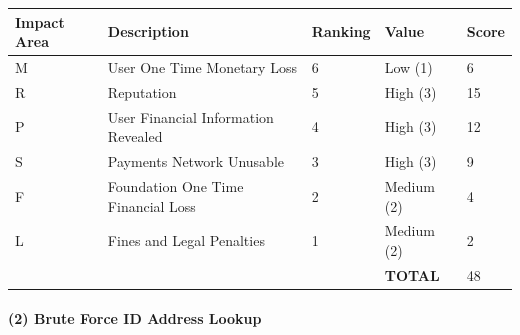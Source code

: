 \documentclass[a4paper,12pt]{article} %
\begin{document}
{\begin{center}
\begin{tabular}{ | l | l | l | l | l |}
  \hline
  \textbf{Impact Area} & \textbf{Description} & \textbf{Ranking} & \textbf{Value} & \textbf{Score}
  \\ \hline
  M & User One Time Monetary Loss			& 6	& Low (1)		& 6
  \\ \hline
  R & Reputation		& 5	& High (3)		& 15
  \\ \hline
  P & User Financial Information Revealed		& 4	& High (3)		& 12
  \\ \hline
  S & Payments Network Unusable					& 3	& High (3)		& 9
  \\ \hline
  F & Foundation One Time Financial Loss	& 2	& Medium (2)	& 4
  \\ \hline
  L & Fines and Legal Penalties						& 1	& Medium (2)	& 2
  \\ \hline
  & & & \textbf{TOTAL} & 48
  \\ \hline
\end{tabular}
\end{center}
\label{tab:severityIdOrAmlDatabaseHacked}

\paragraph{(2) Brute Force ID Address Lookup }

}
\end{document}
